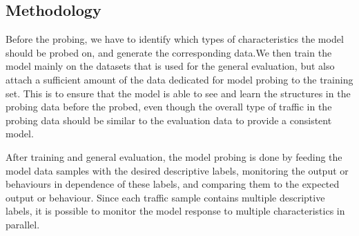 \documentclass[conference]{IEEEtran}
\begin{document}

\subsection{Methodology}

Before the probing, we have to identify which types of characteristics the model should be probed on, and generate the corresponding data.We then train the model mainly on the datasets that is used for the general evaluation, but also attach a sufficient amount of the data dedicated for model probing to the training set. This is to ensure that the model is able to see and learn the structures in the probing data before the probed, even though the overall type of traffic in the probing data should be similar to the evaluation data to provide a consistent model.

After training and general evaluation, the model probing is done by feeding the model data samples with the desired descriptive labels, monitoring the output or behaviours in dependence of these labels, and comparing them to the expected output or behaviour. Since each traffic sample contains multiple descriptive labels, it is possible to monitor the model response to multiple characteristics in parallel.




\end{document}

